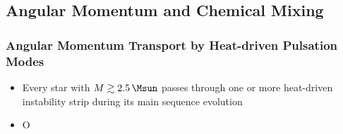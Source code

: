 
\subsection{Angular Momentum and Chemical Mixing}


{\color{brown}
\subsubsection{Angular Momentum Transport by Heat-driven Pulsation Modes}

\begin{itemize}
\item Every star with $M \gtrsim 2.5\,\Msun$ passes through one or more heat-driven instability strip during its main sequence evolution
\item O
\end{itemize}


}


